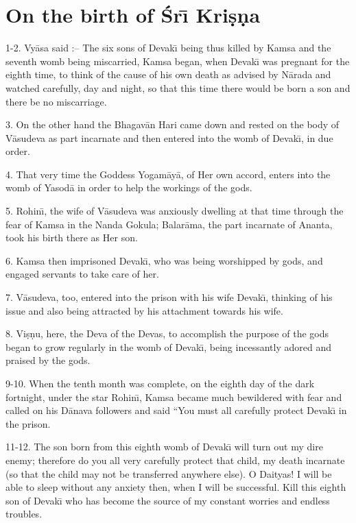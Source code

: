\chapter{On the birth of \'Sr\={\i} Kri\d{s}\d{n}a}

1-2. Vy\=asa said :-- The six sons of Devak\={\i} being thus killed by Kamsa and the seventh womb being miscarried, Kamsa began, when Devak\={\i} was pregnant for the eighth time, to think of the cause of his own death as advised by N\=arada and watched carefully, day and night, so that this time there would be born a son and there be no miscarriage.

3. On the other hand the Bhagav\=an Hari came down and rested on the body of V\=asudeva as part incarnate and then entered into the womb of Devak\={\i}, in due order.

4. That very time the Goddess Yogam\=ay\=a, of Her own accord, enters into the womb of Yasod\=a in order to help the workings of the gods.

5. Rohin\={\i}, the wife of V\=asudeva was anxiously dwelling at that time through the fear of Kamsa in the Nanda Gokula; Balar\=ama, the part incarnate of Ananta, took his birth there as Her son.

6. Kamsa then imprisoned Devak\={\i}, who was being worshipped by gods, and engaged servants to take care of her.

7. V\=asudeva, too, entered into the prison with his wife Devak\={\i}, thinking of his issue and also being attracted by his attachment towards his wife.

8. Vi\d{s}\d{n}u, here, the Deva of the Devas, to accomplish the purpose of the gods began to grow regularly in the womb of Devak\={\i}, being incessantly adored and praised by the gods.

9-10. When the tenth month was complete, on the eighth day of the dark fortnight, under the star Rohin\={\i}, Kamsa became much bewildered with fear and called on his D\=anava followers and said ``You must all carefully protect Devak\={\i} in the prison.

11-12. The son born from this eighth womb of Devak\={\i} will turn out my dire enemy; therefore do you all very carefully protect that child, my death incarnate (so that the child may not be transferred anywhere else). O Daityas! I will be able to sleep without any anxiety then, when I will be successful. Kill this eighth son of Devak\={\i} who has become the source of my constant worries and endless troubles.

